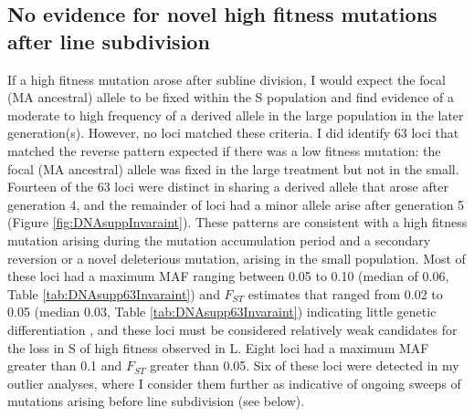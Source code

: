 \subsection{No evidence for novel high fitness mutations after line subdivision}
If a high fitness mutation arose after subline division, I would expect the focal (MA ancestral) allele to be fixed within the S population and find evidence of a moderate to high frequency of a derived allele in the large population in the later generation(s). However, no loci matched these criteria. I did identify 63 loci that matched the reverse pattern expected if there was a low fitness mutation: the focal (MA ancestral) allele was fixed in the large treatment but not in the small. Fourteen of the 63 loci were distinct in sharing a derived allele that arose after generation 4, and the remainder of loci had a minor allele arise after generation 5 (Figure \ref{fig:DNAsuppInvaraint}). These patterns are consistent with a high fitness mutation arising during the mutation accumulation period and a secondary reversion or a novel deleterious mutation, arising in the small population. Most of these loci had a maximum MAF ranging between 0.05 to 0.10 (median of 0.06, Table \ref{tab:DNAsupp63Invaraint}) and $F_{ST}$ estimates that ranged from 0.02 to 0.05 (median 0.03, Table \ref{tab:DNAsupp63Invaraint}) indicating little genetic differentiation \citep{Hart97}, and these loci must be considered relatively weak candidates for the loss in S of high fitness observed in L. Eight loci had a maximum MAF greater than 0.1 and $F_{ST}$ greater than 0.05. Six of these loci were detected in my outlier analyses, where I consider them further as indicative of ongoing sweeps of mutations arising before line subdivision (see below).\par

